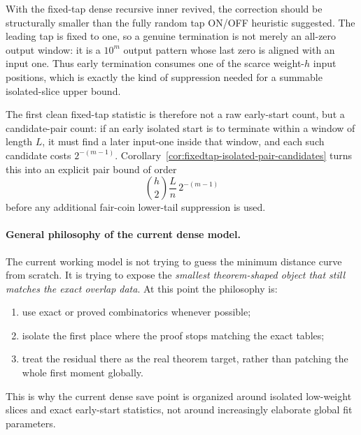 With the fixed-tap dense recursive inner revived, the correction should be structurally smaller than the fully random
tap ON/OFF heuristic suggested. The leading tap is fixed to one, so a genuine termination is not merely an all-zero output window:
it is a \(10^m\) output pattern whose last zero is aligned with an input one. Thus early termination consumes one of
the scarce weight-\(h\) input positions, which is exactly the kind of suppression needed for a summable isolated-slice
upper bound.

The first clean fixed-tap statistic is therefore not a raw early-start count, but a candidate-pair count: if an early
isolated start is to terminate within a window of length \(L\), it must find a later input-one inside that window, and
each such candidate costs \(2^{-(m-1)}\). Corollary~\ref{cor:fixedtap-isolated-pair-candidates} turns this into an
explicit pair bound of order
\[
\binom{h}{2}\frac{L}{n}\,2^{-(m-1)}
\]
before any additional fair-coin lower-tail suppression is used.

\paragraph{General philosophy of the current dense model.}
The current working model is not trying to guess the minimum distance curve from scratch. It is trying to expose the
\emph{smallest theorem-shaped object that still matches the exact overlap data}.
At this point the philosophy is:
\begin{enumerate}
\item use exact or proved combinatorics whenever possible;
\item isolate the first place where the proof stops matching the exact tables;
\item treat the residual there as the real theorem target, rather than patching the whole first moment globally.
\end{enumerate}
This is why the current dense save point is organized around isolated low-weight slices and exact early-start
statistics, not around increasingly elaborate global fit parameters.

